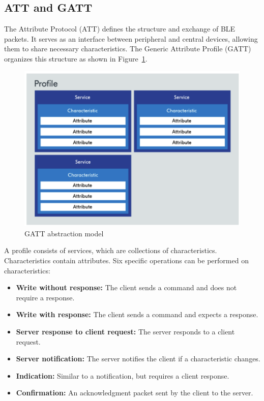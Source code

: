\documentclass{Configuration_Files/PoliMi3i_thesis}
\begin{document}
\subsection{ATT and GATT}
The Attribute Protocol (ATT) defines the structure and exchange of BLE packets. It serves as an interface between peripheral and central devices, allowing them to share necessary characteristics. The Generic Attribute Profile (GATT) organizes this structure as shown in Figure~\ref{gatt_model}. 

\begin{figure}[h]
    \centering
    \includegraphics[width=\linewidth]{Bluetooth Low Energy/Screenshot 2024-08-15 at 23.26.01.png}
    \caption{GATT abstraction model}
    \label{gatt_model}
\end{figure}

A profile consists of services, which are collections of characteristics. Characteristics contain attributes. Six specific operations can be performed on characteristics:
\begin{itemize}
    \item \textbf{Write without response:} The client sends a command and does not require a response.
    \item \textbf{Write with response:} The client sends a command and expects a response.
    \item \textbf{Server response to client request:} The server responds to a client request.
    \item \textbf{Server notification:} The server notifies the client if a characteristic changes.
    \item \textbf{Indication:} Similar to a notification, but requires a client response.
    \item \textbf{Confirmation:} An acknowledgment packet sent by the client to the server.
\end{itemize}
\end{document}
